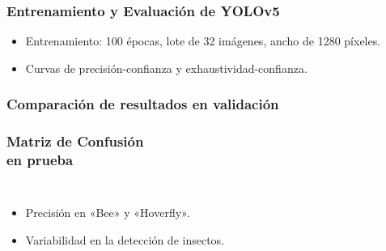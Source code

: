 \begin{frame}
    \frametitle{Entrenamiento y Evaluación de YOLOv5}
    \vspace*{-1mm}
    \begin{itemize}
        \item Entrenamiento: 100 épocas, lote de 32 imágenes, ancho de 1280 píxeles.
        \item Curvas de precisión-confianza y exhaustividad-confianza.
    \end{itemize}
    \vspace*{-3mm}
    \begin{center}
        \hspace*{3mm}
    \end{center}
\end{frame}


\begin{frame}
    \frametitle{Comparación de resultados en validación}
    \vspace*{-0.7cm}
    \begin{center}
    \end{center}
\end{frame}


\begin{frame}
    \frametitle{Matriz de Confusión\\ en prueba}
    \vspace*{-2.1cm}
    \begin{columns}
        \vspace*{-0.6cm}
        \begin{itemize}
            \item Precisión en «Bee» y «Hoverfly».
            \item Variabilidad en la detección de insectos.
        \end{itemize}
        \begin{center}
        \end{center}
    \end{columns}
\end{frame}




